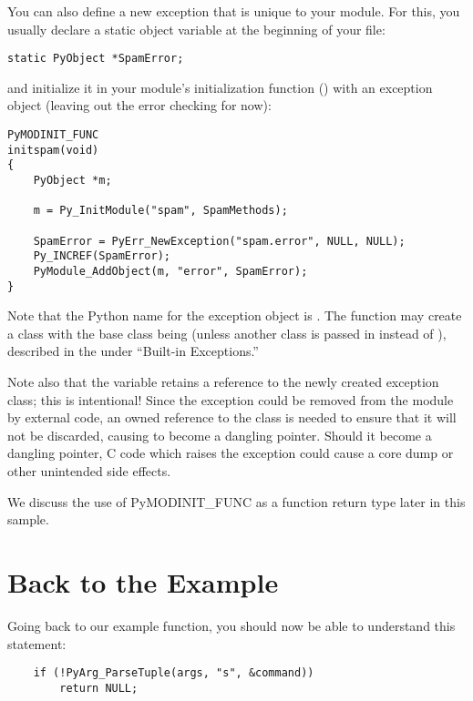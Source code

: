 You can also define a new exception that is unique to your module.
For this, you usually declare a static object variable at the
beginning of your file:

\begin{verbatim}
static PyObject *SpamError;
\end{verbatim}

and initialize it in your module's initialization function
() with an exception object (leaving out
the error checking for now):

\begin{verbatim}
PyMODINIT_FUNC
initspam(void)
{
    PyObject *m;

    m = Py_InitModule("spam", SpamMethods);

    SpamError = PyErr_NewException("spam.error", NULL, NULL);
    Py_INCREF(SpamError);
    PyModule_AddObject(m, "error", SpamError);
}
\end{verbatim}

Note that the Python name for the exception object is
.  The  function
may create a class with the base class being 
(unless another class is passed in instead of \NULL), described in the
 under ``Built-in
Exceptions.''

Note also that the  variable retains a reference to
the newly created exception class; this is intentional!  Since the
exception could be removed from the module by external code, an owned
reference to the class is needed to ensure that it will not be
discarded, causing  to become a dangling pointer.
Should it become a dangling pointer, C code which raises the exception
could cause a core dump or other unintended side effects.

We discuss the use of PyMODINIT_FUNC as a function return type later in this
sample.

\section{Back to the Example
         \label{backToExample}}

Going back to our example function, you should now be able to
understand this statement:

\begin{verbatim}
    if (!PyArg_ParseTuple(args, "s", &command))
        return NULL;
\end{verbatim}

